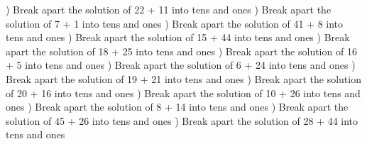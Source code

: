 \documentclass{article}%
\begin{document}
) Break apart the solution of 22 + 11 into tens and ones%
\newline%
\newline%
) Break apart the solution of 7 + 1 into tens and ones%
\newline%
\newline%
) Break apart the solution of 41 + 8 into tens and ones%
\newline%
\newline%
) Break apart the solution of 15 + 44 into tens and ones%
\newline%
\newline%
) Break apart the solution of 18 + 25 into tens and ones%
\newline%
\newline%
) Break apart the solution of 16 + 5 into tens and ones%
\newline%
\newline%
) Break apart the solution of 6 + 24 into tens and ones%
\newline%
\newline%
) Break apart the solution of 19 + 21 into tens and ones%
\newline%
\newline%
) Break apart the solution of 20 + 16 into tens and ones%
\newline%
\newline%
) Break apart the solution of 10 + 26 into tens and ones%
\newline%
\newline%
) Break apart the solution of 8 + 14 into tens and ones%
\newline%
\newline%
) Break apart the solution of 45 + 26 into tens and ones%
\newline%
\newline%
) Break apart the solution of 28 + 44 into tens and ones%
\end{document}
